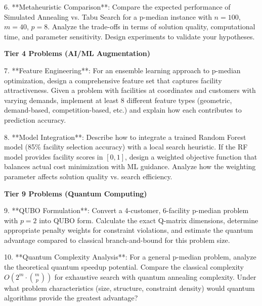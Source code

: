 \documentclass{article}
\begin{document}
6. **Metaheuristic Comparison**: Compare the expected performance of Simulated Annealing vs. Tabu Search for a p-median instance with \(n = 100\), \(m = 40\), \(p = 8\). Analyze the trade-offs in terms of solution quality, computational time, and parameter sensitivity. Design experiments to validate your hypotheses.

\textbf{Tier 4 Problems (AI/ML Augmentation)}

7. **Feature Engineering**: For an ensemble learning approach to p-median optimization, design a comprehensive feature set that captures facility attractiveness. Given a problem with facilities at coordinates and customers with varying demands, implement at least 8 different feature types (geometric, demand-based, competition-based, etc.) and explain how each contributes to prediction accuracy.

8. **Model Integration**: Describe how to integrate a trained Random Forest model (85\% facility selection accuracy) with a local search heuristic. If the RF model provides facility scores in \([0,1]\), design a weighted objective function that balances actual cost minimization with ML guidance. Analyze how the weighting parameter affects solution quality vs. search efficiency.

\textbf{Tier 9 Problems (Quantum Computing)}

9. **QUBO Formulation**: Convert a 4-customer, 6-facility p-median problem with \(p = 2\) into QUBO form. Calculate the exact Q-matrix dimensions, determine appropriate penalty weights for constraint violations, and estimate the quantum advantage compared to classical branch-and-bound for this problem size.

10. **Quantum Complexity Analysis**: For a general p-median problem, analyze the theoretical quantum speedup potential. Compare the classical complexity \(O(2^m \cdot \binom{m}{p})\) for exhaustive search with quantum annealing complexity. Under what problem characteristics (size, structure, constraint density) would quantum algorithms provide the greatest advantage?
\end{document}
